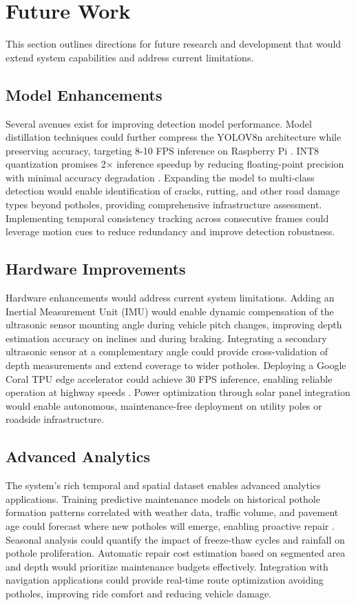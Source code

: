 \documentclass{ieeeaccess}
\begin{document}
\section{Future Work}

This section outlines directions for future research and development that would extend system capabilities and address current limitations.

\subsection{Model Enhancements}
Several avenues exist for improving detection model performance. Model distillation techniques could further compress the YOLOV8n architecture while preserving accuracy, targeting 8-10 FPS inference on Raspberry Pi \cite{b18}. INT8 quantization promises 2$\times$ inference speedup by reducing floating-point precision with minimal accuracy degradation \cite{b10}. Expanding the model to multi-class detection would enable identification of cracks, rutting, and other road damage types beyond potholes, providing comprehensive infrastructure assessment. Implementing temporal consistency tracking across consecutive frames could leverage motion cues to reduce redundancy and improve detection robustness.

\subsection{Hardware Improvements}
Hardware enhancements would address current system limitations. Adding an Inertial Measurement Unit (IMU) would enable dynamic compensation of the ultrasonic sensor mounting angle during vehicle pitch changes, improving depth estimation accuracy on inclines and during braking. Integrating a secondary ultrasonic sensor at a complementary angle could provide cross-validation of depth measurements and extend coverage to wider potholes. Deploying a Google Coral TPU edge accelerator could achieve 30 FPS inference, enabling reliable operation at highway speeds \cite{b11}. Power optimization through solar panel integration would enable autonomous, maintenance-free deployment on utility poles or roadside infrastructure.

\subsection{Advanced Analytics}
The system's rich temporal and spatial dataset enables advanced analytics applications. Training predictive maintenance models on historical pothole formation patterns correlated with weather data, traffic volume, and pavement age could forecast where new potholes will emerge, enabling proactive repair \cite{b17}. Seasonal analysis could quantify the impact of freeze-thaw cycles and rainfall on pothole proliferation. Automatic repair cost estimation based on segmented area and depth would prioritize maintenance budgets effectively. Integration with navigation applications could provide real-time route optimization avoiding potholes, improving ride comfort and reducing vehicle damage.
\end{document}
